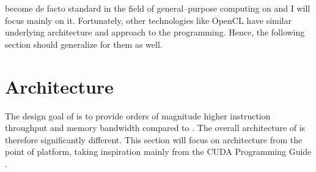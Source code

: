 \cuda become de facto standard in the field of general--purpose computing on \gpu and I will focus mainly on it. Fortunately, other technologies like OpenCL have similar underlying architecture and approach to the \gpu programming. Hence, the following section should generalize for them as well.




\section{Architecture}

The design goal of \gpu is to provide orders of magnitude higher instruction throughput and memory bandwidth compared to \cpuns. The overall architecture of \gpu is therefore significantly different. This section will focus on \gpu architecture from the point of \cuda platform, taking inspiration mainly from the CUDA Programming Guide \citep{CUDAguide}.

